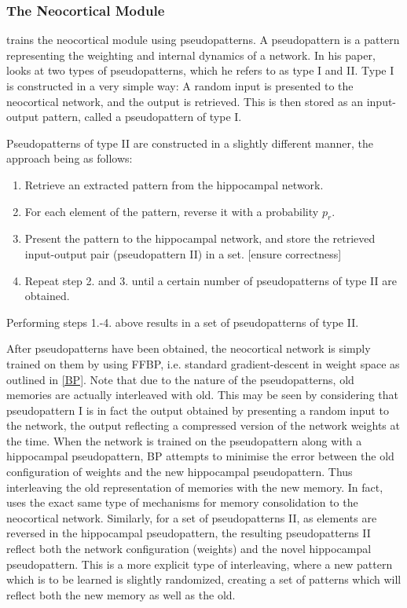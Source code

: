 \subsubsection{The Neocortical Module}

\cite{Hattori2010} trains the neocortical module using pseudopatterns. A pseudopattern is a pattern representing the weighting and internal dynamics of a network. In his paper, \cite{Hattori2010} looks at two types of pseudopatterns, which he refers to as type I and II. Type I is constructed in a very simple way: A random input is presented to the neocortical network, and the output is retrieved. This is then stored as an input-output pattern, called a pseudopattern of type I.

Pseudopatterns of type II are constructed in a slightly different manner, the approach being as follows:

\begin{enumerate}
\item Retrieve an extracted pattern from the hippocampal network.
\item For each element of the pattern, reverse it with a probability $p_r$.
\item Present the pattern to the hippocampal network, and store the retrieved input-output pair (pseudopattern II) in a set. [ensure correctness]
\item Repeat step 2. and 3. until a certain number of pseudopatterns of type II are obtained.
\end{enumerate}
Performing steps 1.-4. above results in a set of pseudopatterns of type II.

After pseudopatterns have been obtained, the neocortical network is simply trained on them by using FFBP, i.e. standard gradient-descent in weight space as outlined in \ref{BP}. Note that due to the nature of the pseudopatterns, old memories are actually interleaved with old. This may be seen by considering that pseudopattern I is in fact the output obtained by presenting a random input to the network, the output reflecting a compressed version of the network weights at the time. When the network is trained on the pseudopattern along with a hippocampal pseudopattern, BP attempts to minimise the error between the old configuration of weights and the new hippocampal pseudopattern. Thus interleaving the old representation of memories with the new memory. In fact, \cite{Hattori2014} uses the exact same type of mechanisms for memory consolidation to the neocortical network.
Similarly, for a set of pseudopatterns II, as elements are reversed in the hippocampal pseudopattern, the resulting pseudopatterns II reflect both the network configuration (weights) and the novel hippocampal pseudopattern. This is a more explicit type of interleaving, where a new pattern which is to be learned is slightly randomized, creating a set of patterns which will reflect both the new memory as well as the old.

